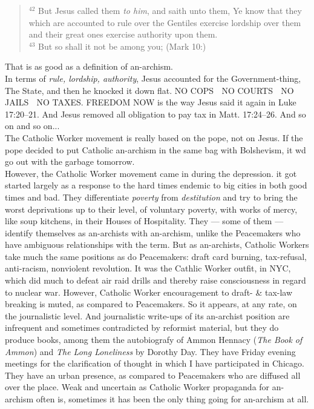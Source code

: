 \documentclass[12pt, onecolumn, letterpaper, oneside]{book}
\begin{document}
\blockquote{$^{42}$ But Jesus called them \emph{to him}, and saith unto them, Ye know that they which are accounted to rule over the Gentiles exercise lordship over them and their great ones exercise authority upon them.\\
$^{43}$ But so shall it not be among you; (Mark 10:)}
That is as good as a definition of an-archism.\\
In terms of \emph{rule, lordship, authority}, Jesus accounted for the Government-thing, The State, and then he knocked it down flat. NO COPS $\;$ NO COURTS $\;$ NO JAILS $\;$ NO TAXES. FREEDOM NOW is the way Jesus said it again in Luke 17:20--21. And Jesus removed all obligation to pay tax in Matt. 17:24--26. And so on and so on...\\
The Catholic Worker movement is really based on the pope, not on Jesus. If the pope decided to put Catholic an-archism in the same bag with Bolshevism, it wd go out with the garbage tomorrow.\\
However, the Catholic Worker movement came in during the depression. it got started largely as a response to the hard times endemic to big cities in both good times and bad. They differentiate \emph{poverty} from \emph{destitution} and try to bring the worst deprivations up to their level, of voluntary poverty, with works of mercy, like soup kitchens, in their Houses of Hospitality. They --- some of them --- identify themselves as an-archists with an-archism, unlike the Peacemakers who have ambiguous relationships with the term. But as an-archists, Catholic Workers take much the same positions as do Peacemakers: draft card burning, tax-refusal, anti-racism, nonviolent revolution. It was the Cathlic Worker outfit, in NYC, which did much to defeat air raid drills and thereby raise consciousness in regard to nuclear war. However, Catholic Worker encouragement to draft- \& tax-law breaking is muted, as compared to Peacemakers. So it appears, at any rate, on the journalistic level. And journalistic write-ups of its an-archist position are infrequent and sometimes contradicted by reformist material, but they do produce books, among them the autobiografy of Ammon Hennacy (\emph{The Book of Ammon}) and \emph{The Long Loneliness} by Dorothy Day. They have Friday evening meetings for the clarification of thought in which I have participated in Chicago. They have an urban presence, as compared to Peacemakers who are diffused all over the place. Weak and uncertain as Catholic Worker propaganda for an-archism often is, sometimes it has been the only thing going for an-archism at all.\\
\end{document}
